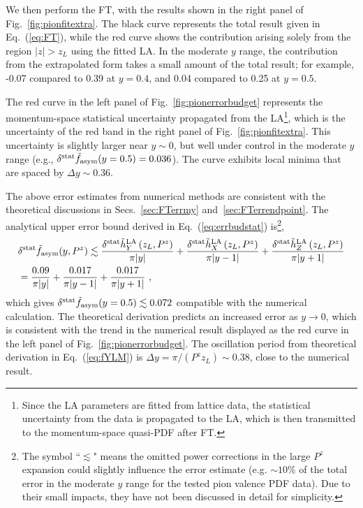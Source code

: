 \documentclass[a4paper,11pt]{article}
\begin{document}
We then perform the FT, with the results shown in the right panel of Fig.~\ref{fig:pionfitextra}. The black curve represents the total result given in Eq.~(\ref{eq:FT}), while the red curve shows the contribution arising solely from the region $|z|>z_L$ using the fitted LA. In the moderate $y$ range, the contribution from the extrapolated form takes a small amount of the total result; for example, -0.07 compared to 0.39 at $y=0.4$, and 0.04 compared to 0.25 at $y=0.5$. 

The red curve in the left panel of Fig.~\ref{fig:pionerrorbudget} represents the momentum-space statistical uncertainty propagated from the LA\footnote{Since the LA parameters are fitted from lattice data, the statistical uncertainty from the data is propagated to the LA, which is then transmitted to the momentum-space quasi-PDF after FT.}, which is the uncertainty of the red band in the right panel of Fig.~\ref{fig:pionfitextra}. This uncertainty is slightly larger near $y\sim0$, but well under control in the moderate $y$ range (e.g., $\delta^{\rm stat}\tilde f_{\rm asym}(y=0.5) = 0.036$). The curve exhibits local minima that are spaced by $\Delta y \sim 0.36$.

The above error estimates from numerical methods are consistent with the theoretical discussions in Secs.~\ref{sec:FTerrmy} and~\ref{sec:FTerrendpoint}. The analytical upper error bound derived in Eq.~(\ref{eq:errbudstat}) is\footnote{The symbol ``$\lesssim$" means the omitted power corrections in the large $P^z$ expansion could slightly influence the error estimate (e.g. $\sim10\%$ of the total error in the moderate $y$ range for the tested pion valence PDF data). Due to their small impacts, they have not been discussed in detail for simplicity.},
\begin{align}
&\delta^{\rm stat} \tilde f_{\rm asym}(y,P^z)  \lesssim \frac{\delta^{\rm stat} \tilde{h}^{\rm LA}_{Y}\left(z_L,P^z\right)}{\pi |y|}  
+ \frac{\delta^{\rm stat} \tilde{h}^{\rm LA}_{X}\left(z_L,P^z\right)}{\pi |y-1|}  
+ \frac{\delta^{\rm stat} \tilde{h}^{\rm LA}_{Z}\left(z_L,P^z\right)}{\pi |y+1|}  \nonumber\\
&=\frac{0.09}{\pi |y|} + \frac{0.017}{\pi |y-1|}  + \frac{0.017}{\pi |y+1|} \ ,
\end{align}
which gives $\delta^{\rm stat} \tilde f_{\rm asym}(y=0.5) \lesssim 0.072$ compatible with the numerical calculation. The theoretical derivation predicts an increased error as $y \rightarrow 0$, which is consistent with the trend in the numerical result displayed as the red curve in the left panel of Fig.~\ref{fig:pionerrorbudget}. The oscillation period from theoretical derivation in Eq.~(\ref{eq:fYLM}) is $\Delta y= \pi/(P^z z_L) \sim 0.38$, close to the numerical result.  
\end{document}
